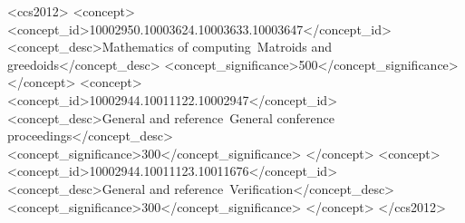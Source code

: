 \begin{CCSXML}
<ccs2012>
   <concept>
       <concept_id>10002950.10003624.10003633.10003647</concept_id>
       <concept_desc>Mathematics of computing~Matroids and greedoids</concept_desc>
       <concept_significance>500</concept_significance>
       </concept>
   <concept>
       <concept_id>10002944.10011122.10002947</concept_id>
       <concept_desc>General and reference~General conference proceedings</concept_desc>
       <concept_significance>300</concept_significance>
       </concept>
   <concept>
       <concept_id>10002944.10011123.10011676</concept_id>
       <concept_desc>General and reference~Verification</concept_desc>
       <concept_significance>300</concept_significance>
       </concept>
 </ccs2012>
\end{CCSXML}

